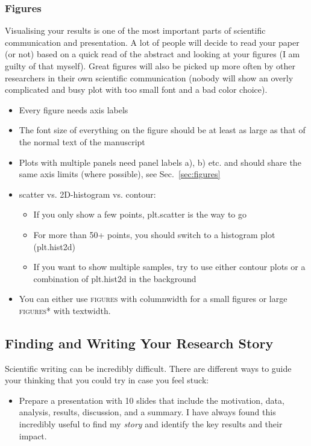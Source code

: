 \documentclass[fleqn,usenatbib]{mnras}
\begin{document}
\subsubsection{Figures}

Visualising your results is one of the most important parts of scientific communication and presentation. A lot of people will decide to read your paper (or not) based on a quick read of the abstract and looking at your figures (I am guilty of that myself). Great figures will also be picked up more often by other researchers in their own scientific communication (nobody will show an overly complicated and busy plot with too small font and a bad color choice).

\begin{itemize}
    \item Every figure needs axis labels
    \item The font size of everything on the figure should be at least as large as that of the normal text of the manuscript
    \item Plots with multiple panels need panel labels a), b) etc. and should share the same axis limits (where possible), see Sec.~\ref{sec:figures}
    \item scatter vs. 2D-histogram vs. contour:
    \begin{itemize}
        \item If you only show a few points, plt.scatter is the way to go
        \item For more than 50+ points, you should switch to a histogram plot (plt.hist2d)
        \item If you want to show multiple samples, try to use either contour plots or a combination of plt.hist2d in the background
    \end{itemize}    
    \item You can either use \textsc{figures} with columnwidth for a small figures or large \textsc{figures*} with textwidth.
\end{itemize}

\subsection{Finding and Writing Your Research Story}

Scientific writing can be incredibly difficult. There are different ways to guide your thinking that you could try in case you feel stuck:
\begin{itemize}
    \item Prepare a presentation with 10 slides that include the motivation, data, analysis, results, discussion, and a summary. I have always found this incredibly useful to find my \textit{story} and identify the key results and their impact.
\end{itemize}
\end{document}
